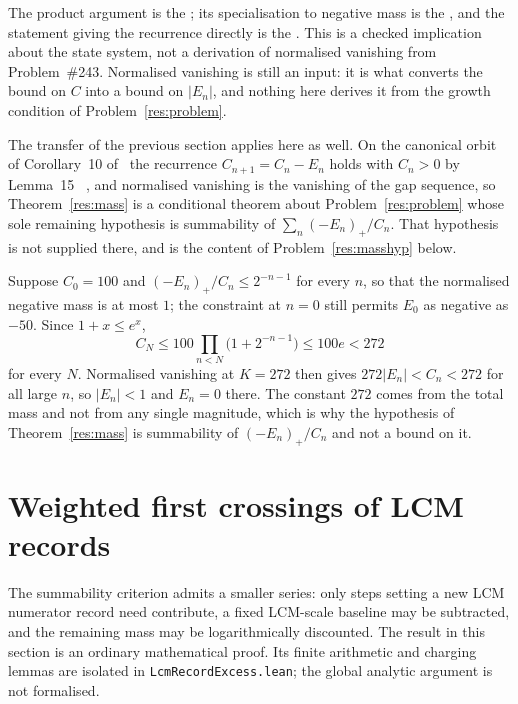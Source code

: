 \documentclass[11pt]{article}
\begin{document}
\noindent The product argument is the
; its specialisation to negative mass is the
, and the statement giving the recurrence directly is
the
.  This is a checked implication about
the state system, not a derivation of normalised vanishing from
Problem~\#243.  Normalised vanishing is still an input: it is what converts the
bound on $C$ into a bound on $|E_n|$, and nothing here derives it from the
growth condition of Problem~\ref{res:problem}.

The transfer of the previous section applies here as well.  On the canonical
orbit of Corollary~10 of~\cite[p.~8]{koizumi2025} the recurrence
$C_{n+1}=C_n-E_n$ holds with $C_n>0$ by Lemma~15
~\cite[p.~9]{koizumi2025}, and normalised vanishing is the vanishing of
the gap sequence, so Theorem~\ref{res:mass} is a conditional theorem about
Problem~\ref{res:problem} whose sole remaining hypothesis is summability of
$\sum_n(-E_n)_+/C_n$.  That hypothesis is not supplied there, and is the
content of Problem~\ref{res:masshyp} below.

\begin{example}\label{ex:mass}
Suppose $C_0=100$ and $(-E_n)_+/C_n\le2^{-n-1}$ for every $n$, so that the
normalised negative mass is at most $1$; the constraint at $n=0$ still permits
$E_0$ as negative as $-50$.  Since $1+x\le e^{x}$,
\[
 C_N\le100\prod_{n<N}\bigl(1+2^{-n-1}\bigr)\le100e<272
\]
for every $N$.  Normalised vanishing at $K=272$ then gives
$272|E_n|<C_n<272$ for all large $n$, so $|E_n|<1$ and $E_n=0$ there.  The
constant $272$ comes from the total mass and not from any single magnitude,
which is why the hypothesis of Theorem~\ref{res:mass} is summability of
$(-E_n)_+/C_n$ and not a bound on it.
\end{example}

\section{Weighted first crossings of LCM records}\label{sec:lcmrecords}

The summability criterion admits a smaller series: only steps setting a new
LCM numerator record need contribute, a fixed LCM-scale baseline may be
subtracted, and the remaining mass may be logarithmically discounted.
The result in this section is an ordinary mathematical proof. Its finite
arithmetic and charging lemmas are isolated in
\texttt{LcmRecordExcess.lean}; the global analytic argument is not formalised.
\end{document}
